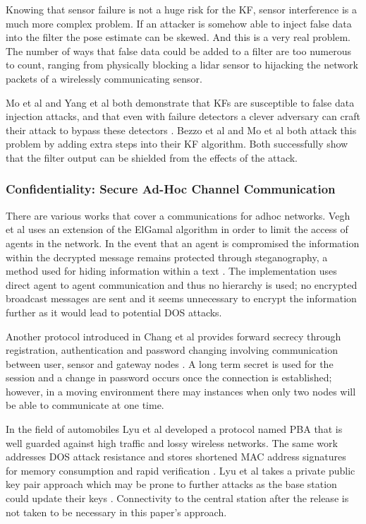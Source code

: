 \documentclass[conference]{IEEEtran}
\begin{document}
Knowing that sensor failure is not a huge risk for the KF, sensor interference is a much more complex problem. If an attacker is somehow able to inject false data into the filter the pose estimate can be skewed. And this is a very real problem. The number of ways that false data could be added to a filter are too numerous to count, ranging from physically blocking a lidar sensor to hijacking the network packets of a wirelessly communicating sensor.

Mo et al and Yang et al both demonstrate that KFs are susceptible to false data injection attacks, and that even with failure detectors a clever adversary can craft their attack to bypass these detectors \cite{Mo2010}\cite{Yang2013}. Bezzo et al and Mo et al both attack this problem by adding extra steps into their KF algorithm\cite{Bezzo_2014}\cite{Mo2014}. Both successfully show that the filter output can be shielded from the effects of the attack.


\subsubsection{Confidentiality: Secure Ad-Hoc Channel Communication}
There are various works that cover a communications for adhoc networks. Vegh et al uses an extension of the ElGamal algorithm in order to limit the access of agents in the network\cite{vegh2014securing}. In the event that an agent is compromised the information within the decrypted message remains protected through steganography, a method used for hiding information within a text \cite{adi2009mechatronic}. The implementation uses direct agent to agent communication and thus no hierarchy is used; no encrypted broadcast messages are sent and it seems unnecessary to encrypt the information further as it would lead to potential DOS attacks.

Another protocol introduced in Chang et al provides forward secrecy through registration, authentication and password changing involving communication between user, sensor and gateway nodes \cite{chang2016provably}. A long term secret is used for the session and a change in password occurs once the connection is established; however, in a moving environment there may instances when only two nodes will be able to communicate at one time.

In the field of automobiles Lyu et al developed a protocol named PBA that is well guarded against high traffic and lossy wireless networks\cite{lyu2016pba}. The same work addresses DOS attack resistance and stores shortened MAC address signatures for memory consumption and rapid verification \cite{lyu2016pba}. Lyu et al takes a private public key pair approach which may be prone to further attacks as the base station could update their keys \cite{lyu2016pba}. Connectivity to the central station after the release is not taken to be necessary in this paper's approach.
\end{document}
